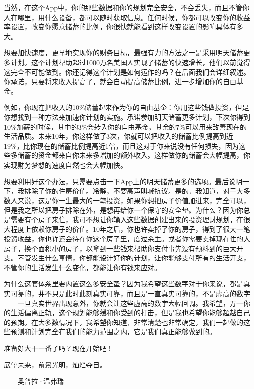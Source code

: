 当然，在这个App中，你的那些数据和你的规划完全安全，不会丢失，而且不管你人在哪里，用什么设备，都可以随时获取信息。任何时候，你都可以改变你的收益率设置，改变你愿意储蓄的比例，你很快就能看到这样改变设置的影响具体有多大。

想要加快速度，更早地实现你的财务目标，最强有力的方法之一是采用明天储蓄更多计划。这个计划帮助超过1000万名美国人实现了储蓄的快速增长，他们以前觉得这完全不可能做到。你还记得这个计划是如何运作的吗？在后面我们会详细叙述。你承诺，只要将来收入提高了，就会自动提高储蓄比例，进一步增加你的自由基金。

例如，你现在把收入的10\%储蓄起来作为你的自由基金：你用这些钱做投资，但是你想找到一种方法来加速你计划的实施。承诺参加明天储蓄更多计划，下次你得到10\%加薪的时候，其中的3\%会转入你的自由基金，其余的7\%可以用来改善现在的生活品质。未来10年，你这样做了3次，你就可以把收入的储蓄比例提高到近19\%，比你现在的储蓄比例提高近1倍，而且这对于你来说没有任何损失，因为这些多储蓄的资金都来自你未来多增加的额外收入。这样做你的储蓄会大幅提高，你实现财务梦想的速度自然也会大幅加快。

想要利用好这个办法，只需要点击一下App上的明天储蓄更多的选项。最后说明一下，我排除了你的住房价值。冷静，不要高声叫喊抗议。是的，我知道，对于大多数人来说，这是你一生最大的一笔投资，如果你想把房子价值加进来，完全可以，但是我之所以把房子排除在外，是想再给你一个保守的安全垫。为什么？因为你总是需要有个房子来住，我可不想让你输入这些数据创建出来的投资理财规划，在很大程度上依赖你房子的价值。10年之后，你也许卖掉了你的房子，得到了很大一笔投资收益，你也许还会待在你这个房子里，度过余生。或者你需要卖掉现在住的大房子，换个面积小的房子，以拿到一些钱来帮助你支付事先没有预料到的巨大开支。不管发生什么事情，你都能设计好你的计划，让你能够支付所有的生活开支，不管你的生活发生什么变化，都能让你有钱来应对。

为什么这套体系里要内置这么多安全垫？因为我希望这些数字对于你来说，都是真实可靠的，并不只是此时此刻真实可靠，而且是一直真实可靠的，不是虚高的数字——一旦真实世界出现意外，你就会让这些虚高的数字大幅回调。我希望，万一你的生活偏离正轨，这个规划能够缓和你受到的打击，但是我也希望你能够超越自己的预期。在大多数情况下，我希望你知道，非常清楚也非常确定，我们一起做的这些预测和计划完全在我们的能力范围之内，它是我们真正能够做到的。

准备好大干一番了吗？现在开始吧！

\begin{BookQuote}
展望未来，前景光明，灿烂夺目。

\hfill ——奥普拉·温弗瑞
\end{BookQuote}


